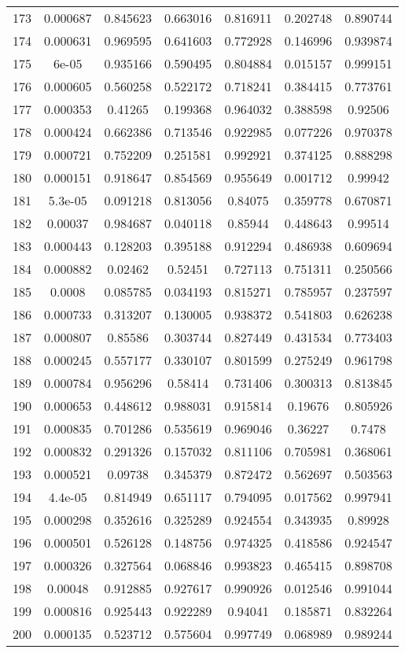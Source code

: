 \begin{table}
\begin{tabular}{c|c|c|c|c|c|c}
173 & 0.000687 & 0.845623 & 0.663016 & 0.816911 & 0.202748 & 0.890744\\
174 & 0.000631 & 0.969595 & 0.641603 & 0.772928 & 0.146996 & 0.939874\\
175 & 6e-05 & 0.935166 & 0.590495 & 0.804884 & 0.015157 & 0.999151\\
176 & 0.000605 & 0.560258 & 0.522172 & 0.718241 & 0.384415 & 0.773761\\
177 & 0.000353 & 0.41265 & 0.199368 & 0.964032 & 0.388598 & 0.92506\\
178 & 0.000424 & 0.662386 & 0.713546 & 0.922985 & 0.077226 & 0.970378\\
179 & 0.000721 & 0.752209 & 0.251581 & 0.992921 & 0.374125 & 0.888298\\
180 & 0.000151 & 0.918647 & 0.854569 & 0.955649 & 0.001712 & 0.99942\\
181 & 5.3e-05 & 0.091218 & 0.813056 & 0.84075 & 0.359778 & 0.670871\\
182 & 0.00037 & 0.984687 & 0.040118 & 0.85944 & 0.448643 & 0.99514\\
183 & 0.000443 & 0.128203 & 0.395188 & 0.912294 & 0.486938 & 0.609694\\
184 & 0.000882 & 0.02462 & 0.52451 & 0.727113 & 0.751311 & 0.250566\\
185 & 0.0008 & 0.085785 & 0.034193 & 0.815271 & 0.785957 & 0.237597\\
186 & 0.000733 & 0.313207 & 0.130005 & 0.938372 & 0.541803 & 0.626238\\
187 & 0.000807 & 0.85586 & 0.303744 & 0.827449 & 0.431534 & 0.773403\\
188 & 0.000245 & 0.557177 & 0.330107 & 0.801599 & 0.275249 & 0.961798\\
189 & 0.000784 & 0.956296 & 0.58414 & 0.731406 & 0.300313 & 0.813845\\
190 & 0.000653 & 0.448612 & 0.988031 & 0.915814 & 0.19676 & 0.805926\\
191 & 0.000835 & 0.701286 & 0.535619 & 0.969046 & 0.36227 & 0.7478\\
192 & 0.000832 & 0.291326 & 0.157032 & 0.811106 & 0.705981 & 0.368061\\
193 & 0.000521 & 0.09738 & 0.345379 & 0.872472 & 0.562697 & 0.503563\\
194 & 4.4e-05 & 0.814949 & 0.651117 & 0.794095 & 0.017562 & 0.997941\\
195 & 0.000298 & 0.352616 & 0.325289 & 0.924554 & 0.343935 & 0.89928\\
196 & 0.000501 & 0.526128 & 0.148756 & 0.974325 & 0.418586 & 0.924547\\
197 & 0.000326 & 0.327564 & 0.068846 & 0.993823 & 0.465415 & 0.898708\\
198 & 0.00048 & 0.912885 & 0.927617 & 0.990926 & 0.012546 & 0.991044\\
199 & 0.000816 & 0.925443 & 0.922289 & 0.94041 & 0.185871 & 0.832264\\
200 & 0.000135 & 0.523712 & 0.575604 & 0.997749 & 0.068989 & 0.989244\\
\end{tabular}
\end{table}
